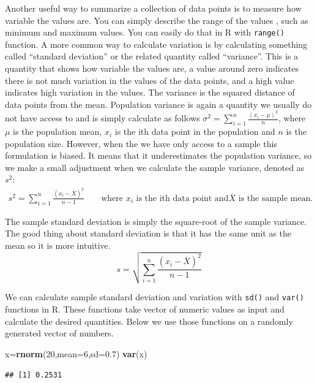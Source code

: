 \documentclass[12pt,]{krantz}
\newenvironment{Shaded}{\begin{snugshade}}{\end{snugshade}}
\newcommand{\DataTypeTok}[1]{\textcolor[rgb]{0.13,0.29,0.53}{#1}}
\newcommand{\DecValTok}[1]{\textcolor[rgb]{0.00,0.00,0.81}{#1}}
\newcommand{\FloatTok}[1]{\textcolor[rgb]{0.00,0.00,0.81}{#1}}
\newcommand{\KeywordTok}[1]{\textcolor[rgb]{0.13,0.29,0.53}{\textbf{#1}}}
\newcommand{\NormalTok}[1]{#1}
\begin{document}
Another useful way to summarize a collection of data points is to measure
how variable the values are. You can simply describe the range of the values
, such as minimum and maximum values. You can easily do that in R with \texttt{range()}
function. A more common way to calculate variation is by calculating something
called ``standard deviation'' or the related quantity called ``variance''. This is a
quantity that shows how variable the values are, a value around zero indicates
there is not much variation in the values of the data points, and a high value
indicates high variation in the values. The variance is the squared distance of
data points from the mean. Population variance is again a quantity we usually
do not have access to and is simply calculate as follows \(\sigma^2=\sum_{i=1}^n \frac{(x_i-\mu)^2}{n}\), where \(\mu\) is the population mean, \(x_i\) is the ith
data point in the population and \(n\) is the population size. However, when the
we have only access to a sample this formulation is biased. It means that it
underestimates the population variance, so we make a small adjustment when we
calculate the sample variance, denoted as \(s^2\):
\[
\begin{aligned}
s^2=\sum_{i=1}^n \frac{(x_i-\overline{X})^2}{n-1} && \text{ where $x_i$ is the ith data point and
$\overline{X}$ is the sample mean.}
\end{aligned}
\]

The sample standard deviation is simply the square-root of the sample variance.
The good thing about standard deviation is that it has the same unit as the mean
so it is more intuitive.\\
\[s=\sqrt{\sum_{i=1}^n \frac{(x_i-\overline{X})^2}{n-1}}\]

We can calculate sample standard deviation and variation with \texttt{sd()} and \texttt{var()}
functions in R. These functions take vector of numeric values as input and
calculate the desired quantities. Below we use those functions on a randomly
generated vector of numbers.

\begin{Shaded}
\begin{Highlighting}[]
\NormalTok{x=}\KeywordTok{rnorm}\NormalTok{(}\DecValTok{20}\NormalTok{,}\DataTypeTok{mean=}\DecValTok{6}\NormalTok{,}\DataTypeTok{sd=}\FloatTok{0.7}\NormalTok{)}
\KeywordTok{var}\NormalTok{(x)}
\end{Highlighting}
\end{Shaded}

\begin{verbatim}
## [1] 0.2531
\end{verbatim}
\end{document}
